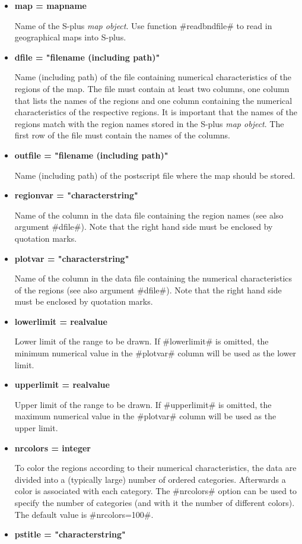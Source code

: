 \begin{itemize}
\item {\bf map = mapname}

Name of the S-plus {\em map object}. Use function #readbndfile# to read
in geographical maps into S-plus. \item {\bf dfile = "filename
(including path)"}

Name (including path) of the file containing numerical
characteristics of the regions of the map. The file must contain
at least two columns, one column that lists the names of the
regions and one column containing the numerical characteristics of
the respective regions. It is important that the names of the
regions match with the region names stored in the S-plus {\em map
object}. The first row of the file must contain the names of the
columns.
\item {\bf outfile = "filename (including path)"}

Name (including path) of the postscript file where the map should
be stored.
\item {\bf regionvar = "characterstring"}

Name of the column in the data file containing the region names
(see also argument #dfile#). Note that the right hand side must be
enclosed by quotation marks. \item {\bf plotvar = "characterstring"}

Name of the column in the data file containing the numerical
characteristics of the regions (see also argument #dfile#). Note
that the right hand side must be enclosed by quotation marks.
\item {\bf lowerlimit = realvalue}

Lower limit of the range to be drawn. If #lowerlimit# is omitted,
the minimum numerical value in the #plotvar# column will be
used as the lower limit. \item {\bf upperlimit = realvalue}

Upper limit of the range to be drawn. If #upperlimit# is omitted,
the maximum numerical value in the #plotvar# column will be
used as the upper limit. \item {\bf nrcolors = integer}

To color the regions according to their numerical characteristics,
the data are divided into a (typically large) number of ordered
categories. Afterwards a color is associated with each category.
The #nrcolors# option can be used to specify the number of
categories (and with it the number of different colors). The
default value is #nrcolors=100#. \item {\bf pstitle = "characterstring"}


\end{itemize}
